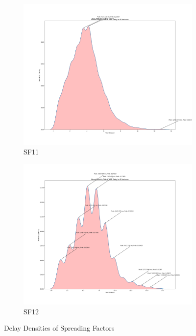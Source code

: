 \begin{figure}[htp!]
    \begin{subfigure}{0.45\linewidth}
        \includegraphics[width=\linewidth]{images/Total Delay density5.png}
        \caption{SF11}
    \end{subfigure}
    \hfill
    \begin{subfigure}{0.45\linewidth}
        \includegraphics[width=\linewidth]{images/Total Delay density6.png}
        \caption{SF12}
    \end{subfigure}
    \caption{Delay Densities of Spreading Factors}
    \label{fig:density collage}
\end{figure}

